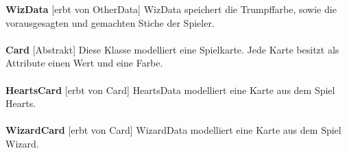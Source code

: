 \documentclass{article}
\begin{document}
		\textbf{WizData} [erbt von OtherData] WizData speichert die Trumpffarbe, sowie die vorausgesagten und gemachten Stiche der Spieler. \\ \\
		\textbf{Card} [Abstrakt] Diese Klasse modelliert eine Spielkarte. Jede Karte besitzt als Attribute einen Wert und eine Farbe. \\ \\
		
		\textbf{HeartsCard} [erbt von Card]  HeartsData modelliert eine Karte aus dem Spiel Hearts. \\ \\
		
		\textbf{WizardCard} [erbt von Card] WizardData modelliert eine Karte aus dem Spiel Wizard. \\ \\
\end{document}
